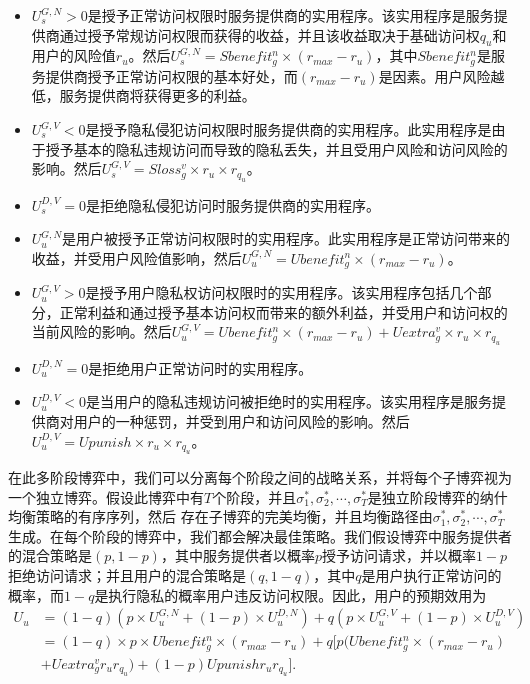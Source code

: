 \begin{itemize}
	\item $U_s^{G,N} >0$是授予正常访问权限时服务提供商的实用程序。该实用程序是服务提供商通过授予常规访问权限而获得的收益，并且该收益取决于基础访问权$q_u$和用户的风险值$r_u$。然后$U_s^{G,N}= Sbenefit_g^n\times (r_{max}-r_u)$​​，其中$Sbenefit_g^n$是服务提供商授予正常访问权限的基本好处，而$(r_{max}-r_u)$​​是因素。用户风险越低，服务提供商将获得更多的利益。
	\item $U_s^{G,V}<0$是授予隐私侵犯访问权限时服务提供商的实用程序。此实用程序是由于授予基本的隐私违规访问而导致的隐私丢失，并且受用户风险和访问风险的影响。然后$U_s^{G,V}= Sloss_g^v \times r_u \times r_{q_u}$。
	\item $U_s^{D,V} = 0$是拒绝隐私侵犯访问时服务提供商的实用程序。
	\item $U_u^{G,N}$是用户被授予正常访问权限时的实用程序。此实用程序是正常访问带来的收益，并受用户风险值影响，然后$U_u^{G,N}= Ubenefit_g^n \times(r_{max} - r_u)$。
	\item $U_u^{G,V} >0$是授予用户隐私权访问权限时的实用程序。该实用程序包括几个部分，正常利益和通过授予基本访问权而带来的额外利益，并受用户和访问权的当前风险的影响。然后$U_u^{G,V}= Ubenefit_g^n\times(r_{max} - r_u) + Uextra_g^v \times r_u\times r_{q_u}$
	\item $U_u^{D,N} =0$是拒绝用户正常访问时的实用程序。
	\item $U_u^{D,V}<0$是当用户的隐私违规访问被拒绝时的实用程序。该实用程序是服务提供商对用户的一种惩罚，并受到用户和访问风险的影响。然后$U_u^{D,V}= Upunish \times r_u \times r_{q_u}$。
\end{itemize}

在此多阶段博弈中，我们可以分离每个阶段之间的战略关系，并将每个子博弈视为一个独立博弈。假设此博弈中有$T$个阶段，并且$\sigma_1^*, \sigma_2^*, \cdots, \sigma_T^*$是独立阶段博弈的纳什均衡策略的有序序列，然后 存在子博弈的完美均衡，并且均衡路径由$\sigma_1^*, \sigma_2^*, \cdots, \sigma_T^*$生成。在每个阶段的博弈中，我们都会解决最佳策略。我们假设博弈中服务提供者的混合策略是$(p,1-p)$，其中服务提供者以概率$p$授予访问请求，并以概率$1-p$拒绝访问请求；并且用户的混合策略是$(q,1-q)$，其中{$ q $}是用户执行正常访问的概率，而$1-q$是执行隐私的概率用户违反访问权限。因此，用户的预期效用为
\begin{equation}
\begin{split}
U_u&= (1-q)(p\times U_u^{G,N}+ (1-p)\times U_u^{D,N})+ q(p\times U_u^{G,V}+(1-p)\times U_u^{D,V})\\
&=(1-q)\times p \times Ubenefit_g^n \times(r_{max} - r_u)+ q[p(Ubenefit_g^n\times(r_{max} - r_u) \\
&+ Uextra_g^v r_ur_{q_u})+(1-p)Upunishr_ur_{q_u}].
\end{split}
\end{equation}


